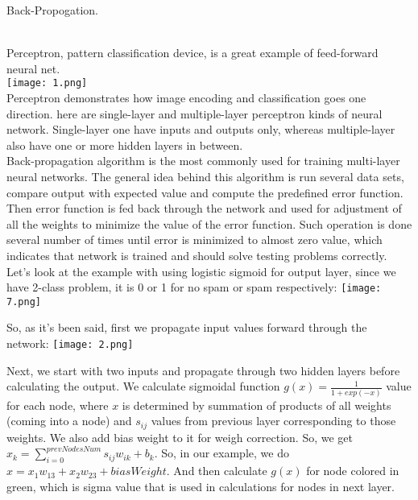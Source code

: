 \documentclass[12pt, letterpaper]{article}
\begin{document}
\begin{enumerate}[label=\Roman*.]
 
 	{\bf \item Back-Propogation.} \\
	
 	Perceptron, pattern classification device, is a great example of feed-forward neural net. \\
	{\center \texttt{[image: 1.png]} \\}
	Perceptron demonstrates how image encoding and classification goes one direction. here are single-layer and multiple-layer perceptron kinds of neural network. Single-layer one have inputs and outputs only, whereas multiple-layer also have one or more hidden layers in between.\\
	
	Back-propagation algorithm is the most commonly used for training multi-layer neural networks. The general idea behind this algorithm is run several data sets, compare output with expected value and compute the predefined error function. Then error function is fed back through the network and used for adjustment of all the weights to minimize the value of the error function. Such operation is done several number of times until error is minimized to almost zero value, which indicates that network is trained and should solve testing problems correctly. Let's look at the example with using logistic sigmoid for output layer, since we have 2-class problem, it is 0 or 1 for no spam or spam respectively:
	{\center \texttt{[image: 7.png]} \\}
	
	So, as it's been said, first we propagate input values forward through the network:
	{\center \texttt{[image: 2.png]} \\}
	
	Next, we start with two inputs and propagate through two hidden layers before calculating the output. We calculate sigmoidal function \(g(x) = \frac{1}{1 + exp(-x)}\) value for each node, where \(x\) is determined by summation of products of all weights (coming into a node) and \(s_{ij}\) values from previous layer corresponding to those weights. We also add bias weight to it for weigh correction. So, we get \( x_k = \sum\limits_{i=0}^{prevNodesNum} s_{ij}w_{ik}+b_k \). So, in our example, we do \(x = x_1w_{13} + x_2w_{23} + biasWeight\). And then calculate \(g(x)\) for node colored in green, which is sigma value that is used in calculations for nodes in next layer. \\
	

\end{enumerate}
\end{document}
